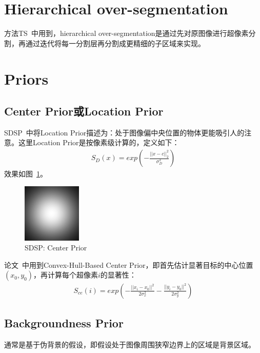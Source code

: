 \documentclass[12pt]{article}
\begin{document}
\section{Hierarchical over-segmentation}

方法TS~\cite{zhu2014tag}中用到，hierarchical over-segmentation是通过先对原图像进行超像素分割，再通过迭代将每一分割层再分割成更精细的子区域来实现。

\section{Priors}

\subsection{Center Prior或Location Prior}

SDSP~\cite{zhang2013sdsp}中将Location Prior描述为：处于图像偏中央位置的物体更能吸引人的注意。这里Location Prior是按像素级计算的，定义如下：
\begin{align}
S_D(x) = exp\left(-\frac{||x-c||_2^2}{\sigma_D^2}\right)
\end{align}
效果如图~\ref{fig: SDSPCenterPrior}。
\begin{figure}[!ht]
\centering
\includegraphics[width=0.25\textwidth]{SDSPCenterPrior.png}
\caption{SDSP: Center Prior}
\label{fig: SDSPCenterPrior}
\end{figure} 

论文~\cite{yang2013graph}中用到Convex-Hull-Based Center Prior，即首先估计显著目标的中心位置$(x_0, y_0)$，再计算每个超像素$i$的显著性：
\begin{align}
S_{ce}(i) = exp\left(-\frac{||x_i-x_0||^2}{2\sigma_x^2}-\frac{||y_i-y_0||^2}{2\sigma_y^2}\right)
\end{align}

\subsection{Backgroundness Prior}

通常是基于伪背景的假设，即假设处于图像周围狭窄边界上的区域是背景区域。
\end{document}
